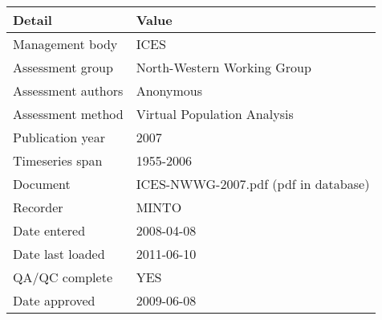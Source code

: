 \begin{table}[htb]
\centering
\begin{tabular}{ll}
\toprule
Detail & Value \\
\midrule
Management body    & ICES                                 \\
Assessment group   & North-Western Working Group          \\
Assessment authors & Anonymous                            \\
Assessment method  & Virtual Population Analysis          \\
Publication year   & 2007                                 \\
Timeseries span    & 1955-2006                            \\
Document           & ICES-NWWG-2007.pdf (pdf in database) \\
Recorder           & MINTO                                \\
Date entered       & 2008-04-08                           \\
Date last loaded   & 2011-06-10                           \\
QA/QC complete     & YES                                  \\
Date approved      & 2009-06-08                           \\
\bottomrule
\end{tabular}
\label{tab:assessdet}
\end{table}
